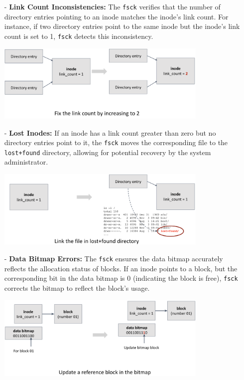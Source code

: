 \documentclass[../../compsys.tex]{subfiles}
\begin{document}
\begin{itemize}
    \item [-] \textbf{Link Count Inconsistencies:}
    The \texttt{fsck} verifies that the number of directory entries pointing to an inode matches the inode's link count. For instance, if two directory entries point to the same inode but the inode's link count is set to 1, \texttt{fsck} detects this inconsistency.
    \begin{center}
        \includegraphics[width=0.8\textwidth]{chapters/L7/images/fsck-link.png}
    \end{center}
\newpage
    \item [-] \textbf{Lost Inodes:}
    If an inode has a link count greater than zero but no directory entries point to it, the \texttt{fsck} moves the corresponding file to the \texttt{lost+found} directory, allowing for potential recovery by the system administrator.
    \begin{center}
        \includegraphics[width=0.8\textwidth]{chapters/L7/images/fsck-link2.png}
    \end{center}

    \item [-] \textbf{Data Bitmap Errors:}
    The \texttt{fsck} ensures the data bitmap accurately reflects the allocation status of blocks. If an inode points to a block, but the corresponding bit in the data bitmap is 0 (indicating the block is free), \texttt{fsck} corrects the bitmap to reflect the block's usage.
    \begin{center}
        \includegraphics[width=0.8\textwidth]{chapters/L7/images/fsck-bitmap.png}
    \end{center}


\end{itemize}
\end{document}
